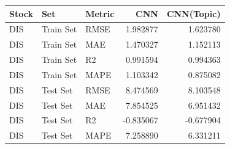 \begin{tabular}{lllrr}
\toprule
Stock & Set & Metric & CNN & CNN(Topic) \\
\midrule
DIS & Train Set & RMSE & 1.982877 & 1.623780 \\
DIS & Train Set & MAE & 1.470327 & 1.152113 \\
DIS & Train Set & R2 & 0.991594 & 0.994363 \\
DIS & Train Set & MAPE & 1.103342 & 0.875082 \\
DIS & Test Set & RMSE & 8.474569 & 8.103548 \\
DIS & Test Set & MAE & 7.854525 & 6.951432 \\
DIS & Test Set & R2 & -0.835067 & -0.677904 \\
DIS & Test Set & MAPE & 7.258890 & 6.331211 \\
\bottomrule
\end{tabular}
